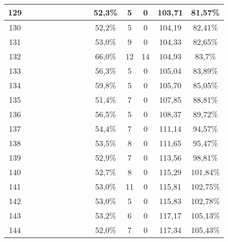 \begin{longtable}{|c|c|c|c|c|c|c|c|c|c|c|c|c|c|}
129 &  \x    & \x    &       &       &       & \x    &       & \x    & 52,3\% &  5  & 0  & 103,71 & 81,57\% \\ \hline
130 &  \x    & \x    &       & \x    &       & \x    &       & \x    & 52,2\% &  5  & 0  & 104,19 & 82,41\% \\ \hline
131 &  \x    & \x    &       & \x    &       & \x\m  &       &       & 53,0\% &  9  & 0  & 104,33 & 82,65\% \\ \hline
132 &  \x    & \x    &       &       & \x\m  &       & \x\m  &       & 66,0\% &  12 & 14 & 104,93 & 83,7\% \\ \hline
133 &  \x    & \x    &       & \x    & \x    &       &       & \x    & 56,3\% &  5  & 0  & 105,04 & 83,89\% \\ \hline
134 &  \x    & \x    & \x    &       &       & \x\m  & \x\m  &       & 59,8\% &  5  & 0  & 105,70 & 85,05\% \\ \hline
135 &  \x    & \x    &       &       &       & \x\m  &       & \x\m  & 51,4\% &  7  & 0  & 107,85 & 88,81\% \\ \hline
136 &  \x    & \x    &       & \x    & \x    &       & \x    &       & 56,5\% &  5  & 0  & 108,37 & 89,72\% \\ \hline
137 &  \x    & \x    &       & \x    &       &       & \x    &       & 54,4\% &  7  & 0  & 111,14 & 94,57\% \\ \hline
138 &  \x    & \x    &       & \x    &       &       & \x\m  &       & 53,5\% &  8  & 0  & 111,65 & 95,47\% \\ \hline
139 &  \x    & \x    &       & \x    &       & \x\m  & \x\m  &       & 52,9\% &  7  & 0  & 113,56 & 98,81\% \\ \hline
140 &  \x    & \x    &       & \x    &       &       &       & \x    & 52,7\% &  8  & 0  & 115,29 & 101,84\% \\ \hline
141 &  \x    & \x    &       &       &       &       & \x\m  &       & 53,0\% &  11 & 0  & 115,81 & 102,75\% \\ \hline
142 &  \x    & \x    &       & \x    &       & \x\m  &       & \x\m  & 53,0\% &  5  & 0  & 115,83 & 102,78\% \\ \hline
143 &  \x    & \x    &       & \x    &       & \x    & \x    &       & 53,2\% &  6  & 0  & 117,17 & 105,13\% \\ \hline
144 &  \x    & \x    &       &       &       & \x\m  & \x\m  &       & 52,0\% &  7  & 0  & 117,34 & 105,43\% \\ \hline
\end{longtable}
\normalsize

